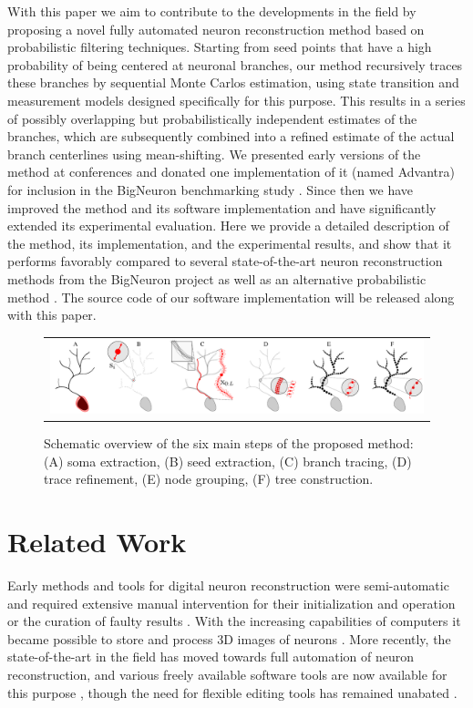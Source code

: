 With this paper we aim to contribute to the developments in the field by proposing a novel fully automated neuron reconstruction method based on probabilistic filtering techniques. Starting from seed points that have a high probability of being centered at neuronal branches, our method recursively traces these branches by sequential Monte Carlos estimation, using state transition and measurement models designed specifically for this purpose. This results in a series of possibly overlapping but probabilistically independent estimates of the branches, which are subsequently combined into a refined estimate of the actual branch centerlines using mean-shifting. We presented early versions of the method at conferences \cite{radojevic2015automated, radojevic2017neuron} and donated one implementation of it (named Advantra) for inclusion in the BigNeuron benchmarking study \cite{peng2015bigneuron, peng2015diadem}. Since then we have improved the method and its software implementation and have significantly extended its experimental evaluation. Here we provide a detailed description of the method, its implementation, and the experimental results, and show that it performs favorably compared to several state-of-the-art neuron reconstruction methods from the BigNeuron project as well as an alternative probabilistic method \cite{radojevic2017automated}. The source code of our software implementation will be released along with this paper.

\begin{figure}
	\begin{tabular}{c}
		\includegraphics[width=\textwidth]{fig1}
	\end{tabular}
	\caption{Schematic overview of the six main steps of the proposed method: (A) soma extraction, (B) seed extraction, (C) branch tracing, (D) trace refinement, (E) node grouping, (F) tree construction.}
	\label{fig1}
\end{figure}

\section{Related Work}
\label{sec:related-work}
Early methods and tools for digital neuron reconstruction were semi-automatic and required extensive manual intervention for their initialization and operation or the curation of faulty results \cite{glaser1965semi, capowski1981accurate, glaser1990neuron, masseroli1993quantitative}. With the increasing capabilities of computers it became possible to store and process 3D images of neurons \cite{cohen1994automated, belichenko1995confocal}. More recently, the state-of-the-art in the field has moved towards full automation of neuron reconstruction, and various freely available software tools are now available for this purpose \cite{peng2010v3d, longair2011simple, peng2014extensible, peng2014virtual}, though the need for flexible editing tools has remained unabated \cite{luisi2011farsight, dercksen2014filament}.

